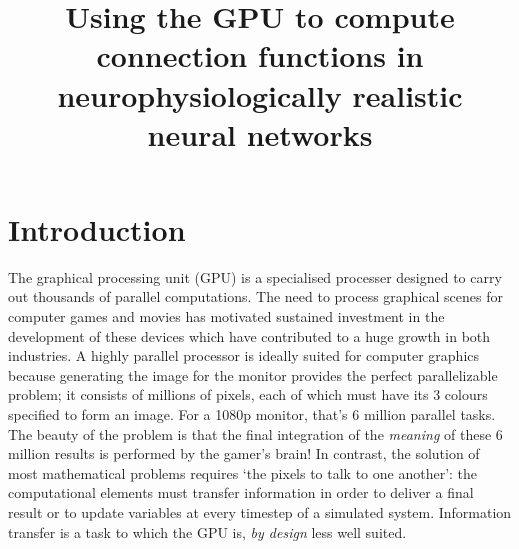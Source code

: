 \documentclass[11pt, a4paper]{article}
\title {Using the GPU to compute connection functions in neurophysiologically
        realistic neural networks}
\date{} %
\author{\Authors}
\begin{document}
\setlength{\droptitle}{-1.8cm} %
\maketitle

\vspace{-1.8cm} %

\section{Introduction}



The graphical processing unit (GPU) is a specialised processer designed to
carry out thousands of parallel computations. The need to process graphical
scenes for computer games and movies has motivated sustained investment in the
development of these devices which have contributed to a huge growth in both
industries. A highly parallel processor is ideally suited for computer
graphics because generating the image for the monitor provides the perfect
parallelizable problem; it consists of millions of pixels, each of which must
have its 3 colours specified to form an image. For a 1080p monitor, that's 6
million parallel tasks. The beauty of the problem is that the final
integration of the
\emph{meaning} of these 6 million results is performed by the gamer's brain! In
contrast, the solution of most mathematical problems requires `the pixels to
talk to one another': the computational elements must transfer information in
order to deliver a final result or to update variables at every timestep of a
simulated system. Information transfer is a task to which the GPU is, \emph{by
design} less well suited.
\end{document}
